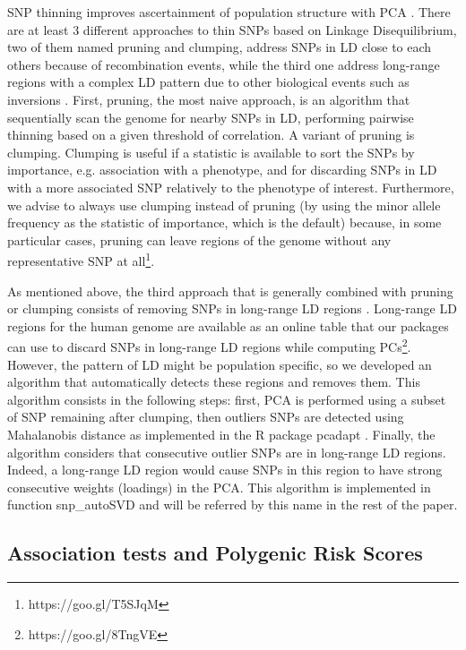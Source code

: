 \documentclass{bioinfo}
\begin{document}
\begin{methods}
SNP thinning improves ascertainment of population structure with PCA \cite[]{Abdellaoui2013}. There are at least 3 different approaches to thin SNPs based on Linkage Disequilibrium, two of them named pruning and clumping, address SNPs in LD close to each others because of recombination events, while the third one address long-range regions with a complex LD pattern due to other biological events such as inversions \cite[]{Price2008}. 
First, pruning, the most naive approach, is an algorithm that sequentially scan the genome for nearby SNPs in LD, performing pairwise thinning based on a given threshold of correlation.
A variant of pruning is clumping. Clumping is useful if a statistic is available to sort the SNPs by importance, e.g. association with a phenotype, and for discarding SNPs in LD with a more associated SNP relatively to the phenotype of interest. Furthermore, we advise to always use clumping instead of pruning (by using the minor allele frequency as the statistic of importance, which is the default) because, in some particular cases, pruning can leave regions of the genome without any representative SNP at all\footnote{https://goo.gl/T5SJqM}.

As mentioned above, the third approach that is generally combined with pruning or clumping consists of removing SNPs in long-range LD regions \cite[]{Price2008}. Long-range LD regions for the human genome are available as an online table that our packages can use to discard SNPs in long-range LD regions while computing PCs\footnote{https://goo.gl/8TngVE}. 
However, the pattern of LD might be population specific, so we developed an algorithm that automatically detects these regions and removes them. This algorithm consists in the following steps: first, PCA is performed using a subset of SNP remaining after clumping, then outliers SNPs are detected using Mahalanobis distance as implemented in the R package pcadapt \cite[]{Luu2017}. Finally, the algorithm considers that consecutive outlier SNPs are in long-range LD regions. Indeed, a long-range LD region would cause SNPs in this region to have strong consecutive weights (loadings) in the PCA. This algorithm is implemented in function snp\_autoSVD and will be referred by this name in the rest of the paper.


\subsection{Association tests and Polygenic Risk Scores}


\end{methods}
\end{document}

